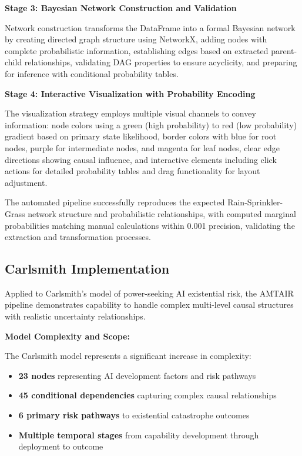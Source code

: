 \documentclass[
  11pt,
  letterpaper,
]{book}
\providecommand{\tightlist}{%
  \setlength{\itemsep}{0pt}\setlength{\parskip}{0pt}}
\begin{document}
\textbf{Stage 3: Bayesian Network Construction and Validation}

Network construction transforms the DataFrame into a formal Bayesian
network by creating directed graph structure using NetworkX, adding
nodes with complete probabilistic information, establishing edges based
on extracted parent-child relationships, validating DAG properties to
ensure acyclicity, and preparing for inference with conditional
probability tables.

\textbf{Stage 4: Interactive Visualization with Probability Encoding}

The visualization strategy employs multiple visual channels to convey
information: node colors using a green (high probability) to red (low
probability) gradient based on primary state likelihood, border colors
with blue for root nodes, purple for intermediate nodes, and magenta for
leaf nodes, clear edge directions showing causal influence, and
interactive elements including click actions for detailed probability
tables and drag functionality for layout adjustment.

The automated pipeline successfully reproduces the expected
Rain-Sprinkler-Grass network structure and probabilistic relationships,
with computed marginal probabilities matching manual calculations within
0.001 precision, validating the extraction and transformation processes.

\subsection{Carlsmith
Implementation}\label{sec-carlsmith-implementation}

Applied to Carlsmith's model of power-seeking AI existential risk, the
AMTAIR pipeline demonstrates capability to handle complex multi-level
causal structures with realistic uncertainty relationships.

\textbf{Model Complexity and Scope:}

The Carlsmith model represents a significant increase in complexity:

\begin{itemize}
\tightlist
\item
  \textbf{23 nodes} representing AI development factors and risk
  pathways
\item
  \textbf{45 conditional dependencies} capturing complex causal
  relationships
\item
  \textbf{6 primary risk pathways} to existential catastrophe outcomes
\item
  \textbf{Multiple temporal stages} from capability development through
  deployment to outcome
\end{itemize}
\end{document}
